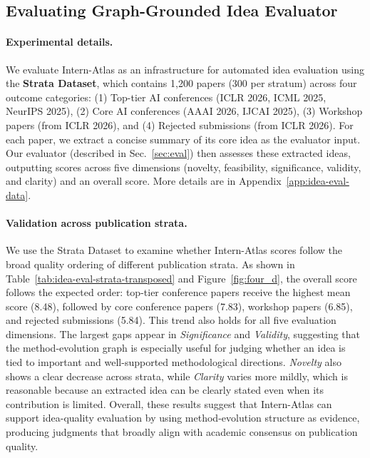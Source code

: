 \documentclass{opendatalab}
\begin{document}
\subsection{Evaluating Graph-Grounded Idea Evaluator}
\label{exp02}

\paragraph{Experimental details.}
We evaluate Intern-Atlas as an infrastructure for automated idea evaluation using the \textbf{Strata Dataset}, which contains 1,200 papers (300 per stratum) across four outcome categories: (1) Top-tier AI conferences (ICLR 2026, ICML 2025, NeurIPS 2025), (2) Core AI conferences (AAAI 2026, IJCAI 2025), (3) Workshop papers (from ICLR 2026), and (4) Rejected submissions (from ICLR 2026). For each paper, we extract a concise summary of its core idea as the evaluator input. Our evaluator (described in Sec.~\ref{sec:eval}) then assesses these extracted ideas, outputting scores across five dimensions (novelty, feasibility, significance, validity, and clarity) and an overall score. More details are in Appendix~\ref{app:idea-eval-data}.

\paragraph{Validation across publication strata.}
We use the Strata Dataset to examine whether Intern-Atlas scores follow the broad quality ordering of different publication strata. As shown in Table~\ref{tab:idea-eval-strata-transposed} and Figure~\ref{fig:four_d}, the overall score follows the expected order: top-tier conference papers receive the highest mean score (8.48), followed by core conference papers (7.83), workshop papers (6.85), and rejected submissions (5.84). This trend also holds for all five evaluation dimensions. The largest gaps appear in \textit{Significance} and \textit{Validity}, suggesting that the method-evolution graph is especially useful for judging whether an idea is tied to important and well-supported methodological directions. \textit{Novelty} also shows a clear decrease across strata, while \textit{Clarity} varies more mildly, which is reasonable because an extracted idea can be clearly stated even when its contribution is limited. Overall, these results suggest that Intern-Atlas can support idea-quality evaluation by using method-evolution structure as evidence, producing judgments that broadly align with academic consensus on publication quality.
\end{document}
